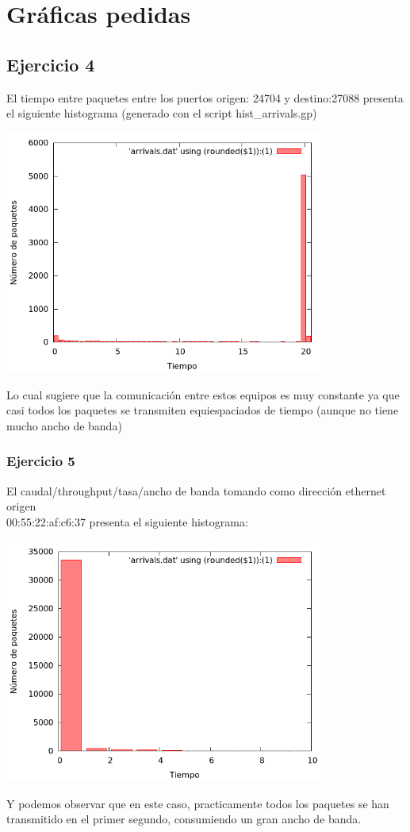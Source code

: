 \documentclass[nochap]{apuntes}
\begin{document}
\section{Gr\'aficas pedidas}
\subsection{Ejercicio 4}

El tiempo entre paquetes entre los puertos origen: 24704 y destino:27088 presenta el siguiente histograma (generado con el script hist\_arrivals.gp)

	\begin{center}
	\includegraphics[width=0.8\textwidth]{imgs/Memoria/mem_arrivals_5.png}
	\end{center}

Lo cual sugiere que la comunicación entre estos equipos es muy constante ya que casi todos los paquetes se transmiten equiespaciados de tiempo (aunque no tiene mucho ancho de banda)

\subsubsection{Ejercicio 5}

El caudal/throughput/tasa/ancho de banda tomando como dirección ethernet origen \\00:55:22:af:c6:37 presenta el siguiente histograma:

\begin{center}
	\includegraphics[width=0.8\textwidth]{imgs/Memoria/mem_caudal.png}
\end{center}

Y podemos observar que en este caso, practicamente todos los paquetes se han transmitido en el primer segundo, consumiendo un gran ancho de banda.
\end{document}

